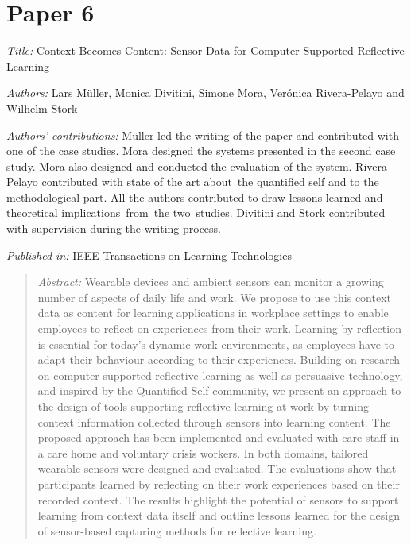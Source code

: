 

\section[P6: Context Becomes Content: Sensor Data for Computer Supported Reflective Learning][Paper 6]{Paper 6}\label{paper-6}

\emph{Title:} Context Becomes Content: Sensor Data for Computer Supported Reflective Learning

\emph{Authors:} Lars Müller, Monica Divitini, Simone Mora, Verónica Rivera-Pelayo and Wilhelm Stork

\emph{Authors' contributions:} Müller led the writing of the paper and contributed with one of the case studies. Mora designed the systems presented in the second case study. Mora also designed and conducted the evaluation of the system. Rivera-Pelayo contributed with state of the art about~the quantified self and to the methodological part. All the authors contributed to draw lessons learned and theoretical implications~from~the two~studies. Divitini and Stork contributed with supervision during the writing process.

\emph{Published in:} IEEE Transactions on Learning Technologies 
\begin{quote}
	\emph{Abstract:} Wearable devices and ambient sensors can monitor a growing number of aspects of daily life and work. We propose to use this context data as content for learning applications in workplace settings to enable employees to reflect on experiences from their work. Learning by reflection is essential for today's dynamic work environments, as employees have to adapt their behaviour according to their experiences. Building on research on computer-supported reflective learning as well as persuasive technology, and inspired by the Quantified Self community, we present an approach to the design of tools supporting reflective learning at work by turning context information collected through sensors into learning content. The proposed approach has been implemented and evaluated with care staff in a care home and voluntary crisis workers. In both domains, tailored wearable sensors were designed and evaluated. The evaluations show that participants learned by reflecting on their work experiences based on their recorded context. The results highlight the potential of sensors to support learning from context data itself and outline lessons learned for the design of sensor-based capturing methods for reflective learning. 
\end{quote}

